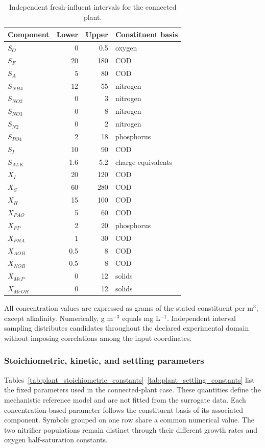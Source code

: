\begin{table}[htbp]
\centering\small
\caption{Independent fresh-influent intervals for the connected plant.}\label{tab:plant_influent_intervals}
\begin{tabular}{lrrl}
\toprule
Component & Lower & Upper & Constituent basis\\
\midrule
$S_O$ & 0 & 0.5 & oxygen\\
$S_F$ & 20 & 180 & COD\\
$S_A$ & 5 & 80 & COD\\
$S_{NH4}$ & 12 & 55 & nitrogen\\
$S_{NO2}$ & 0 & 3 & nitrogen\\
$S_{NO3}$ & 0 & 8 & nitrogen\\
$S_{N2}$ & 0 & 2 & nitrogen\\
$S_{PO4}$ & 2 & 18 & phosphorus\\
$S_I$ & 10 & 90 & COD\\
$S_{ALK}$ & 1.6 & 5.2 & charge equivalents\\
$X_I$ & 20 & 120 & COD\\
$X_S$ & 60 & 280 & COD\\
$X_H$ & 15 & 100 & COD\\
$X_{PAO}$ & 5 & 60 & COD\\
$X_{PP}$ & 2 & 20 & phosphorus\\
$X_{PHA}$ & 1 & 30 & COD\\
$X_{AOB}$ & 0.5 & 8 & COD\\
$X_{NOB}$ & 0.5 & 8 & COD\\
$X_{MeP}$ & 0 & 12 & solids\\
$X_{MeOH}$ & 0 & 12 & solids\\
\bottomrule
\end{tabular}
\end{table}

All concentration values are expressed as grams of the stated constituent per m$^3$, except alkalinity. Numerically, g m$^{-3}$ equals mg L$^{-1}$. Independent interval sampling distributes candidates throughout the declared experimental domain without imposing correlations among the input coordinates.

\subsubsection{Stoichiometric, kinetic, and settling parameters}

Tables~\ref{tab:plant_stoichiometric_constants}--\ref{tab:plant_settling_constants} list the fixed parameters used in the connected-plant case. These quantities define the mechanistic reference model and are not fitted from the surrogate data. Each concentration-based parameter follows the constituent basis of its associated component. Symbols grouped on one row share a common numerical value. The two nitrifier populations remain distinct through their different growth rates and oxygen half-saturation constants.

